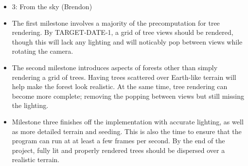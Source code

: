 \documentclass{article}
\begin{document}
\begin{itemize}
\begin{itemize}
\item 3: From the sky (Brendon)
\end{itemize}

\end{itemize}

\begin {itemize}
\item The first milestone involves a majority of the precomputation for tree rendering. By TARGET-DATE-1, a grid of tree views should be rendered, though this will lack any lighting and will noticably pop between views while rotating the camera.

\item The second milestone introduces aspects of forests other than simply rendering a grid of trees. Having trees scattered over Earth-like terrain will help make the forest look realistic. At the same time, tree rendering can become more complete; removing the popping between views but still missing the lighting.

\item Milestone three finishes off the implementation with accurate lighting, as well as more detailed terrain and seeding. This is also the time to ensure that the program can run at at least a few frames per second. By the end of the project, fully lit and properly rendered trees should be dispersed over a realistic terrain.
\end {itemize}
\end{document}
